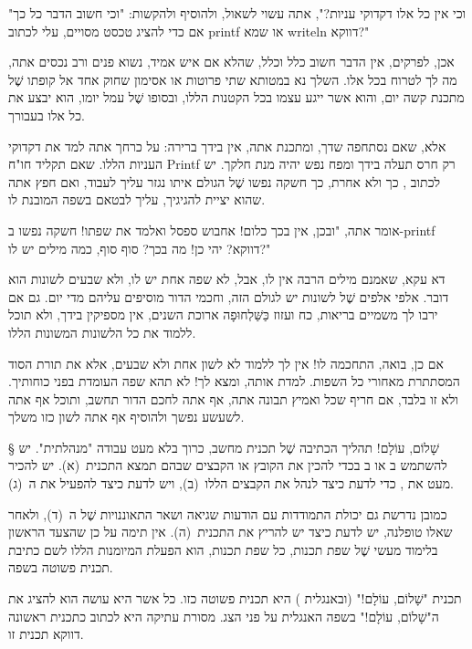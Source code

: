 "וכי אין כל אלו דקדוקי עניות?", אתה עשוי לשאול, ולהוסיף ולהקשות: "וכי חשוב הדבר
כל כך אם כדי להציג טכסט מסויים, עלי לכתוב printf או שמא writeln דווקא?"

אכן, לפרקים, אין הדבר חשוב כלל וכלל, שהלא אם איש אמיד, נשוא פנים ורב נכסים אתה,
מה לך לטרוח בכל אלו. השלך נא במטותא שתי פרוטות או אסימון שחוק אחד אל קופתו שֶׁל
מתכנת קשה יום, והוא אשר ייגע עצמו בכל הקטנות הללו, ובסופו שֶׁל עמל יומו, הוא יבצע
את כל אלו בעבורך.

אלא, שאם נסתחפה שדך, ומתכנת אתה, אין בידך ברירה: על כרחך אתה למד את דקדוקי
העניות הללו. שאם תקליד חו"ח Printf רק חרס תעלה בידך ומפח נפש יהיה מנת חלקך. יש
לכתוב , כך ולא אחרת, כך חשקה נפשו שֶׁל הגולם איתו נגזר עליך לעבוד, ואם
חפץ אתה שהוא יציית להגיגיך, עליך לבטאם בשפה המובנת לו.

אומר אתה, "ובכן, אין בכך כלום! אחבוש ספסל ואלמד את שפתו! חשקה נפשו ב-printf
דווקא? יהי כן! מה בכך? סוף סוף, כמה מילים יש לו?"

דא עקא, שאמנם מילים הרבה אין לו, אבל, לא שפה אחת יש לו, ולא שבעים לשונות הוא
דובר. אלפי אלפים שֶׁל לשונות יש לגולם הזה, וחכמי הדור מוסיפים עליהם מדי יום. גם
אם ירבו לך משמיים בריאות, כח ועזוז כַּשַּׁלְחוּפָה ארוכת השנים, אין מספיקין בידך, ולא
תוכל ללמוד את כל הלשונות המשונות הללו.

אם כן, בואה, התחכמה לו! אין לך ללמוד לא לשון אחת ולא שבעים,
אלא את תורת הסוד המסתתרת
מאחורי כל השפות. למדת אותה, ומצא לך! לא תהא שפה העומדת בפני כוחותיך. ולא זו
בלבד, אם חריף שכל ואמיץ תבונה אתה, אף אתה לחכם הדור תחשב, ותוכל אף אתה לשעשע
נפשך ולהוסיף אף אתה לשון כזו משלך.

\makeatother

\minitoc

§ שָׁלוֹם, עוֹלָם!
תהליך הכתיבה שֶׁל תכנית מחשב, כרוך בלא מעט עבודה "מנהלתית". יש להשתמש ב
או ב בכדי להכין את הקובץ או הקבצים שבהם תמצא
התכנית~(א). יש להכיר מעט את , כדי לדעת כיצד
לנהל את הקבצים הללו~(ב), ויש לדעת כיצד להפעיל את ה~(ג).

כמובן נדרשת גם יכולת התמודדות עם הודעות שגיאה ושאר התאוננויות שֶׁל ה~(ד),
ולאחר שאלו טופלנה, יש לדעת כיצד יש להריץ את התכנית~(ה). אין תימה על כן שהצעד
הראשון בלימוד מעשי שֶׁל שפת תכנות, כל שפת תכנות, הוא הפעלת המיומנות הללו לשם
כתיבת תכנית פשוטה בשפה.

תכנית "שָׁלוֹם, עוֹלָם!" (ובאנגלית
) היא תכנית פשוטה כזו. כל אשר
היא עושה הוא להציג את ה "שָׁלוֹם, עוֹלָם!" בשפה האנגלית על פני הצג.
מסורת
עתיקה היא לכתוב כתכנית ראשונה דווקא תכנית זו.

